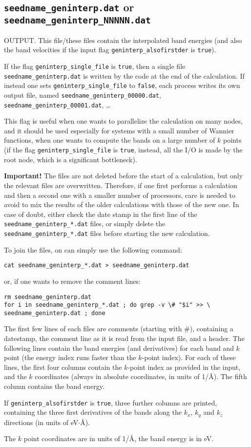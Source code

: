 \subsection{{\tt seedname\_geninterp.dat} or {\tt
    seedname\_geninterp\_NNNNN.dat}}
\label{sec:seedname.geninterp.dat}
OUTPUT. This file/these files contain the interpolated band energies (and also the band
velocities if the input flag \verb#geninterp_alsofirstder# is \verb#true#).

If the flag \verb|geninterp_single_file| is \verb|true|, then a single
file {\tt seedname\_geninterp.dat} is written by the code at the end
of the calculation. If instead one sets \verb|geninterp_single_file|
to \verb|false|, each process writes its own output file, named 
{\tt seedname\_geninterp\_00000.dat}, {\tt
  seedname\_geninterp\_00001.dat}, \ldots

This flag is useful when one wants to parallelize the calculation on
many nodes, and it should be used especially for systems with a small
number of Wannier functions, when one wants to compute the bands on a
large number of $k$ points (if the flag \verb|geninterp_single_file|
is \verb|true|, instead, all the I/O is made by the root node, which
is a significant bottleneck).

{\bf Important!} The files are not deleted before the start of a
calculation, but only the relevant files are overwritten. Therefore,
if one first performs a calculation and then a second one with a smaller
number of processors, care is needed to avoid to mix the results of
the older calculations with those of the new one. In case of doubt,
either check the date stamp in the first line of the {\tt
    seedname\_geninterp\_*.dat} files, or simply
delete the  {\tt
    seedname\_geninterp\_*.dat} files before starting the new
  calculation.

To join the files, on can simply use the following command:
\begin{verbatim}
cat seedname_geninterp_*.dat > seedname_geninterp.dat
\end{verbatim}
or, if one wants to remove the comment lines:
\begin{verbatim}
rm seedname_geninterp.dat
for i in seedname_geninterp_*.dat ; do grep -v \# "$i" >> \
seedname_geninterp.dat ; done
\end{verbatim}


The first few lines of each files are comments (starting with \#),
containing a datestamp, the
comment line as it is read from the input file, and a header.
The following lines contain the band energies (and
derivatives) for each band and $k$ point (the energy
index runs faster than the $k$-point index).
For each of these lines, the first four columns contain the $k$-point index as provided in the
input, and the $k$ coordinates (always in absolute coordinates, in
units of 1/\AA).
The fifth column contains the band energy.

If \verb#geninterp_alsofirstder# is \verb#true#, three further columns
are printed, containing the three first derivatives of the bands along the $k_x$, $k_y$
and $k_z$ directions (in units of eV$\cdot$\AA).

The $k$ point coordinates are in units of 1/\AA, the band energy is in eV.




